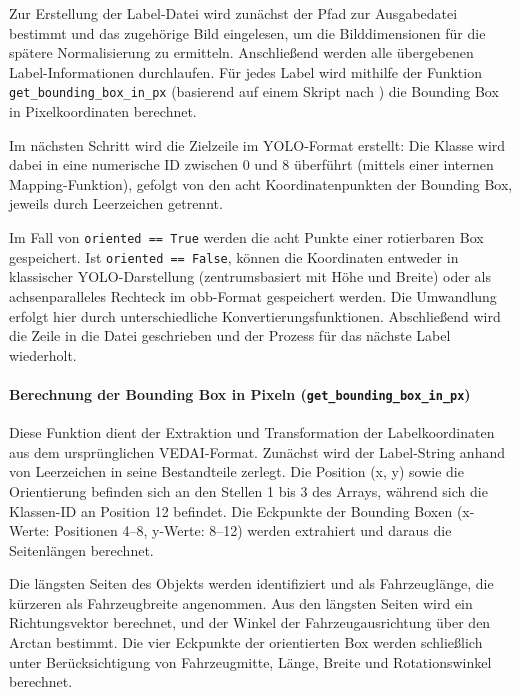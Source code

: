 Zur Erstellung der Label-Datei wird zunächst der Pfad zur Ausgabedatei bestimmt und das zugehörige Bild eingelesen, um die Bilddimensionen für die spätere Normalisierung zu ermitteln. Anschließend werden alle übergebenen Label-Informationen durchlaufen. Für jedes Label wird mithilfe der Funktion \lstinline|get_bounding_box_in_px| (basierend auf einem Skript nach \citeauthor{Razakarivony2015}) die Bounding Box in Pixelkoordinaten berechnet.

Im nächsten Schritt wird die Zielzeile im \acrshort{YOLO}-Format erstellt: Die Klasse wird dabei in eine numerische \acrshort{ID} zwischen 0 und 8 überführt (mittels einer internen Mapping-Funktion), gefolgt von den acht Koordinatenpunkten der Bounding Box, jeweils durch Leerzeichen getrennt.

Im Fall von \lstinline|oriented == True| werden die acht Punkte einer rotierbaren Box gespeichert. Ist \lstinline|oriented == False|, können die Koordinaten entweder in klassischer \acrshort{YOLO}-Darstellung (zentrumsbasiert mit Höhe und Breite) oder als achsenparalleles Rechteck im \acrshort{obb}-Format gespeichert werden. Die Umwandlung erfolgt hier durch unterschiedliche Konvertierungsfunktionen. Abschließend wird die Zeile in die Datei geschrieben und der Prozess für das nächste Label wiederholt.

\paragraph{Berechnung der Bounding Box in Pixeln (\lstinline|get_bounding_box_in_px|)}

Diese Funktion dient der Extraktion und Transformation der Labelkoordinaten aus dem ursprünglichen \acrshort{VEDAI}-Format. Zunächst wird der Label-String anhand von Leerzeichen in seine Bestandteile zerlegt. Die Position (x, y) sowie die Orientierung befinden sich an den Stellen 1 bis 3 des Arrays, während sich die Klassen-\acrshort{ID} an Position 12 befindet. Die Eckpunkte der Bounding Boxen (x-Werte: Positionen 4–8, y-Werte: 8–12) werden extrahiert und daraus die Seitenlängen berechnet.

Die längsten Seiten des Objekts werden identifiziert und als Fahrzeuglänge, die kürzeren als Fahrzeugbreite angenommen. Aus den längsten Seiten wird ein Richtungsvektor berechnet, und der Winkel der Fahrzeugausrichtung über den Arctan bestimmt. Die vier Eckpunkte der orientierten Box werden schließlich unter Berücksichtigung von Fahrzeugmitte, Länge, Breite und Rotationswinkel berechnet.


